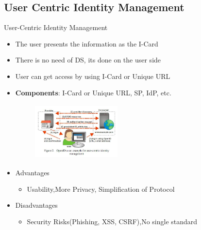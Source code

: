 \documentclass[xcolor=dvipsnames]{beamer}
\begin{document}
\subsection{User Centric Identity Management}
\begin{frame}{User-Centric Identity Management}
\begin{itemize}
\item The user presents the information as the I-Card
\item There is no need of DS, its done on the user side
\item User can get access by using I-Card or Unique URL
\item \textbf{Components}: I-Card or Unique URL, SP, IdP, etc.
\begin{figure}
\includegraphics[width=4.5cm,height=3cm]{ucidm}
\end{figure}
\item Advantages
\begin{itemize}
	\item Usability,More Privacy, Simplification of Protocol
\end{itemize}
\item Disadvantages
\begin{itemize}
	\item Security Risks(Phishing, XSS, CSRF),No single standard 
\end{itemize}
\end{itemize}
\end{frame}
\end{document}

